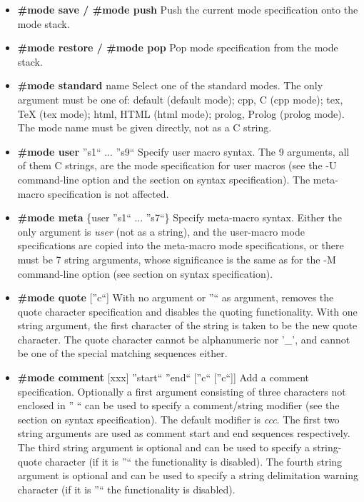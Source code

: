 \begin{itemize}

\item {\bf \#mode save / \#mode push}\htmlBR
Push the current mode specification onto the mode stack. 

\item {\bf \#mode restore / \#mode pop}\htmlBR
Pop mode specification from the mode stack. 

\item {\bf \#mode standard }name\htmlBR
Select one of the standard modes. The only argument must be one of: default
(default mode); cpp, C (cpp mode); tex, TeX (tex mode); html, HTML (html
mode); prolog, Prolog (prolog mode). The mode name must be given directly, not
as a C string. 

\item {\bf \#mode user }''s1`` ... ''s9``\htmlBR
Specify user macro syntax. The 9 arguments, all of them C strings, are the
mode specification for user macros (see the -U command-line option and the
section on syntax specification). The meta-macro specification is not
affected. 

\item {\bf \#mode meta }\{user {\htmlBar} ''s1`` ... ''s7``\}\htmlBR
Specify meta-macro syntax. Either the only argument is {\it user} (not as a
string), and the user-macro mode specifications are copied into the meta-macro
mode specifications, or there must be 7 string arguments, whose significance
is the same as for the -M command-line option (see section on syntax
specification). 

\item {\bf \#mode quote }[''c``]\htmlBR
With no argument or ''`` as argument, removes the quote character
specification and disables the quoting functionality. With one string
argument, the first character of the string is taken to be the new quote
character. The quote character cannot be alphanumeric nor '\_', and cannot be
one of the special matching sequences either. 

\item {\bf \#mode comment }[xxx] ''start`` ''end`` [''c`` [''c``]]\htmlBR
Add a comment specification. Optionally a first argument consisting of three
characters not enclosed in '' `` can be used to specify a comment/string
modifier (see the section on syntax specification). The default modifier is
{\it ccc}. The first two string arguments are used as comment start and end
sequences respectively. The third string argument is optional and can be used
to specify a string-quote character (if it is ''`` the functionality is
disabled). The fourth string argument is optional and can be used to specify a
string delimitation warning character (if it is ''`` the functionality is
disabled). 


\end{itemize}
